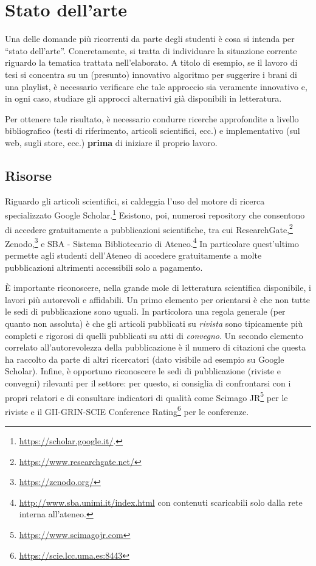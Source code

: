 \chapter{Stato dell'arte}
\label{chap:stato_arte}


Una delle domande più ricorrenti da parte degli studenti \`e cosa si intenda per ``stato dell'arte''. Concretamente, si tratta di individuare la situazione corrente riguardo la tematica trattata nell'elaborato. A titolo di esempio, se il lavoro di tesi si concentra su un (presunto) innovativo algoritmo per suggerire i brani di una playlist, è necessario verificare che tale approccio sia veramente innovativo e, in ogni caso, studiare gli approcci alternativi già disponibili in letteratura.

Per ottenere tale risultato, è necessario condurre ricerche approfondite a livello bibliografico (testi di riferimento, articoli scientifici, ecc.) e implementativo (sul web, sugli store, ecc.) \textbf{prima} di iniziare il proprio lavoro.

\section{Risorse}

Riguardo gli articoli scientifici, si caldeggia l'uso del motore di ricerca specializzato Google Scholar.\footnote{\url{https://scholar.google.it/}.} Esistono, poi, numerosi repository che consentono di accedere gratuitamente a pubblicazioni scientifiche, tra cui ResearchGate,\footnote{\url{https://www.researchgate.net/}} Zenodo,\footnote{\url{https://zenodo.org/}} e SBA - Sistema Bibliotecario di Ateneo.\footnote{\url{http://www.sba.unimi.it/index.html} con contenuti scaricabili solo dalla rete interna all'ateneo.} In particolare quest'ultimo permette agli studenti dell'Ateneo di accedere gratuitamente a molte pubblicazioni altrimenti accessibili solo a pagamento.

\`E importante riconoscere, nella grande mole di letteratura scientifica disponibile, i lavori pi\`u autorevoli e affidabili. Un primo elemento per orientarsi \`e che non tutte le sedi di pubblicazione sono uguali. In particolora una regola generale (per quanto non assoluta) \`e che gli articoli pubblicati su {\em rivista} sono tipicamente pi\`u completi e rigorosi di quelli pubblicati su atti di {\em convegno}. Un secondo elemento correlato all'autorevolezza della pubblicazione \`e il numero di citazioni che questa ha raccolto da parte di altri ricercatori (dato visibile ad esempio su Google Scholar). Infine, \`e opportuno riconoscere le sedi di pubblicazione (riviste e convegni) rilevanti per il settore: per questo, si consiglia di confrontarsi con i propri relatori e di consultare indicatori di qualità come Scimago JR\footnote{\url{https://www.scimagojr.com}} per le riviste e il GII-GRIN-SCIE Conference Rating\footnote{\url{https://scie.lcc.uma.es:8443}} per le conferenze.

